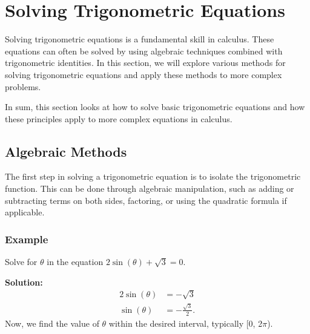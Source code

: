 \documentclass[a4paper,12pt]{book}
\newcounter{problem}
\begin{document}




\section{Solving Trigonometric Equations}
\label{sec:solving_trig_equations}

Solving trigonometric equations is a fundamental skill in calculus. These equations can often be solved by using algebraic techniques combined with trigonometric identities. In this section, we will explore various methods for solving trigonometric equations and apply these methods to more complex problems.

In sum, this section looks at how to solve basic trigonometric equations and how these principles apply to more complex equations in calculus.

\subsection{Algebraic Methods}
\label{subsec:algebraic_methods}
The first step in solving a trigonometric equation is to isolate the trigonometric function. This can be done through algebraic manipulation, such as adding or subtracting terms on both sides, factoring, or using the quadratic formula if applicable.

\subsubsection{Example}
Solve for \(\theta\) in the equation \(2\sin(\theta) + \sqrt{3} = 0\).

\textbf{Solution:}
\begin{align*}
2\sin(\theta) &= -\sqrt{3} \\
\sin(\theta) &= -\frac{\sqrt{3}}{2}.
\end{align*}
Now, we find the value of \(\theta\) within the desired interval, typically [0, 2\(\pi\)).
\end{document}
